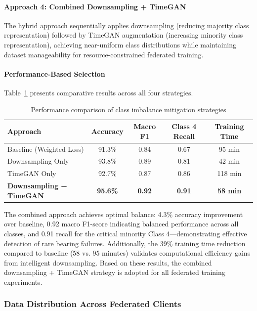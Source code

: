 \documentclass[12pt]{article}
\begin{document}
\paragraph{Approach 4: Combined Downsampling + TimeGAN}
The hybrid approach sequentially applies downsampling (reducing majority class representation) followed by TimeGAN augmentation (increasing minority class representation), achieving near-uniform class distributions while maintaining dataset manageability for resource-constrained federated training.

\paragraph{Performance-Based Selection}
Table~\ref{tab:balancing_comparison} presents comparative results across all four strategies.

\begin{table}[htbp]
\centering
\caption{Performance comparison of class imbalance mitigation strategies}
\label{tab:balancing_comparison}
\begin{tabular}{lcccc}
\toprule
\textbf{Approach} & \textbf{Accuracy} & \textbf{Macro F1} & \textbf{Class 4 Recall} & \textbf{Training Time} \\
\midrule
Baseline (Weighted Loss) & 91.3\% & 0.84 & 0.67 & 95 min \\
Downsampling Only & 93.8\% & 0.89 & 0.81 & 42 min \\
TimeGAN Only & 92.7\% & 0.87 & 0.86 & 118 min \\
\textbf{Downsampling + TimeGAN} & \textbf{95.6\%} & \textbf{0.92} & \textbf{0.91} & \textbf{58 min} \\
\bottomrule
\end{tabular}
\end{table}

The combined approach achieves optimal balance: 4.3\% accuracy improvement over baseline, 0.92 macro F1-score indicating balanced performance across all classes, and 0.91 recall for the critical minority Class 4—demonstrating effective detection of rare bearing failures. Additionally, the 39\% training time reduction compared to baseline (58 vs. 95 minutes) validates computational efficiency gains from intelligent downsampling. Based on these results, the combined downsampling + TimeGAN strategy is adopted for all federated training experiments.
\subsubsection{Data Distribution Across Federated Clients}
\label{subsubsec:data_distribution}
\end{document}
